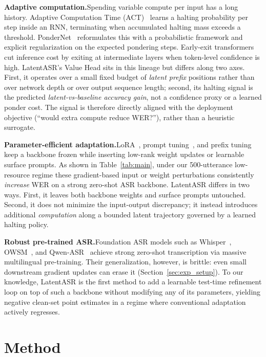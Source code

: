 \documentclass[a4paper]{article}
\newcommand{\method}{LatentASR}
\begin{document}
\textbf{Adaptive computation.}\quad Spending variable compute per input has a long history. Adaptive Computation Time (ACT)~\cite{graves2016adaptive} learns a halting probability per step inside an RNN, terminating when accumulated halting mass exceeds a threshold. PonderNet~\cite{banino2021pondernet} reformulates this with a probabilistic framework and explicit regularization on the expected pondering steps. Early-exit transformers~\cite{schuster2022confident,xin2020deebert} cut inference cost by exiting at intermediate layers when token-level confidence is high. \method{}'s Value Head sits in this lineage but differs along two axes. First, it operates over a small fixed budget of \emph{latent prefix} positions rather than over network depth or over output sequence length; second, its halting signal is the predicted \emph{latent-vs-baseline accuracy gain}, not a confidence proxy or a learned ponder cost. The signal is therefore directly aligned with the deployment objective (``would extra compute reduce WER?''), rather than a heuristic surrogate.

\textbf{Parameter-efficient adaptation.}\quad LoRA~\cite{hu2022lora}, prompt tuning~\cite{lester2021power}, and prefix tuning~\cite{li2021prefix} keep a backbone frozen while inserting low-rank weight updates or learnable surface prompts. As shown in Table~\ref{tab:main}, under our 500-utterance low-resource regime these gradient-based input or weight perturbations consistently \emph{increase} WER on a strong zero-shot ASR backbone. \method{} differs in two ways. First, it leaves both backbone weights and surface prompts untouched. Second, it does not minimize the input-output discrepancy; it instead introduces additional \emph{computation} along a bounded latent trajectory governed by a learned halting policy.

\textbf{Robust pre-trained ASR.}\quad Foundation ASR models such as Whisper~\cite{radford2023robust}, OWSM~\cite{peng2025owsm}, and Qwen-ASR~\cite{yang2024qwen2audio} achieve strong zero-shot transcription via massive multilingual pre-training. Their generalization, however, is brittle: even small downstream gradient updates can erase it (Section~\ref{sec:exp_setup}). To our knowledge, \method{} is the first method to add a learnable test-time refinement loop on top of such a backbone without modifying any of its parameters, yielding negative clean-set point estimates in a regime where conventional adaptation actively regresses.

\section{Method}
\end{document}
